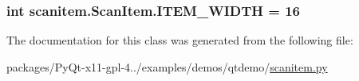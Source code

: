 \subsubsection[{I\+T\+E\+M\+\_\+\+W\+I\+D\+T\+H}]{\setlength{\rightskip}{0pt plus 5cm}int scanitem.\+Scan\+Item.\+I\+T\+E\+M\+\_\+\+W\+I\+D\+T\+H = 16\hspace{0.3cm}{\ttfamily [static]}}\label{classscanitem_1_1ScanItem_add344ae5f49482abf15b0b65263532c2}


The documentation for this class was generated from the following file\+:\begin{DoxyCompactItemize}
\item 
packages/\+Py\+Qt-\/x11-\/gpl-\/4../examples/demos/qtdemo/\hyperlink{scanitem_8py}{scanitem.\+py}\end{DoxyCompactItemize}
